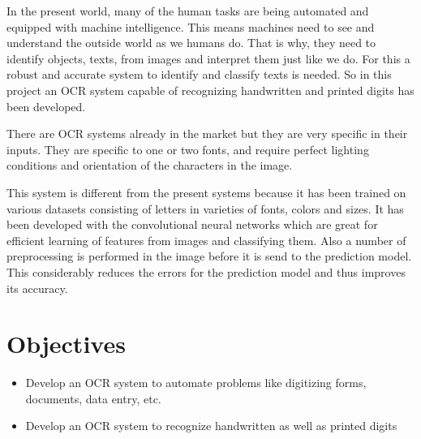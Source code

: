 In the present world, many of the human tasks are being automated and equipped with machine intelligence. This means machines need to see and understand the outside world as we humans do. That is why, they need to identify objects, texts, from images and interpret them just like we do. For this a robust and accurate system to identify and classify texts is needed. So in this project an OCR system capable of recognizing handwritten and printed digits has been developed. 

There are OCR systems already in the market but they are very specific in their inputs. They are specific to one or two fonts, and require perfect lighting conditions and orientation of the characters in the image.

This system is different from the present systems because it has been trained on various datasets consisting of letters in varieties of fonts, colors and sizes. It has been developed with the convolutional neural networks which are great for efficient learning of features from images and classifying them. Also a number of preprocessing is performed in the image before it is send to the prediction model. This considerably reduces the errors for the prediction model and thus improves its accuracy.

\section{Objectives}
\begin{itemize}
\item Develop an OCR system to automate problems like digitizing forms, documents, data entry, etc.
\item Develop an OCR system to recognize handwritten as well as printed digits
\end{itemize}

